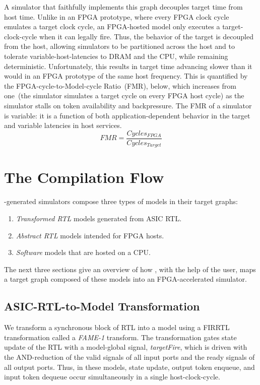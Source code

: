 A simulator that faithfully implements this graph decouples target time from
host time. Unlike in an FPGA prototype, where every FPGA clock cycle emulates a
target clock cycle, an FPGA-hosted model only executes a target-clock-cycle when
it can legally fire. Thus, the behavior of the target is decoupled from the
host, allowing simulators to be partitioned across the host and to tolerate
variable-host-latencies to DRAM and the CPU, while remaining deterministic.
Unfortunately, this results in target time advancing slower than it would in an
FPGA prototype of the same host frequency.  This is quantified by the
FPGA-cycle-to-Model-cycle Ratio~(FMR)\cite{APortNetworks}, below, which increases from
one~(the simulator simulates a target cycle on every FPGA host cycle) as the simulator stalls on token availability and backpressure. The FMR
of a simulator is variable: it is a function of both application-dependent
behavior in the target and variable latencies in host services.
$$ FMR = \frac{Cycles_{FPGA}}{Cycles_{Target}}$$

\section{The \SIMNAME Compilation Flow}\label{sec:fame1}
\SIMNAME-generated simulators compose three types of models in their target graphs:
\begin{enumerate}
    \item \emph{Transformed RTL} models generated from ASIC RTL.
    \item \emph{Abstract RTL} models intended for FPGA hosts.
    \item \emph{Software} models that are hosted on a CPU.
\end{enumerate}

The next three sections give an overview of how \SIMNAME, with the help of the
user, maps a target graph composed of these models into an FPGA-accelerated
simulator.

\subsection{ASIC-RTL-to-Model Transformation}\label{sec:fame1}
We transform a synchronous block of RTL into a model using a FIRRTL~\cite{FIRRTL} transformation called a \emph{FAME-1}
transform. The transformation gates state update of the RTL with a model-global
signal, \emph{targetFire}, which is driven with the AND-reduction of the valid
signals of all input ports and the ready signals of all output ports.  Thus, in
these models, state update, output token enqueue, and input token dequeue occur
simultaneously in a single host-clock-cycle.

